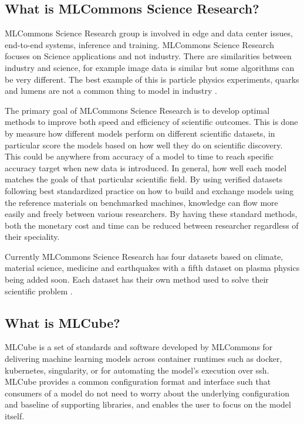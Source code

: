 \documentclass[sigplan,screen]{acmart}
\providecommand{\mlcube}{MLCube}
\begin{document}
\subsection{What is MLCommons Science Research?}

MLCommons Science Research group is involved in edge and data center
issues, end-to-end systems, inference and training. MLCommons Science
Research focuses on Science applications and not industry. There are
similarities between industry and science, for example image data is
similar but some algorithms can be very different. The best example of
this is particle physics experiments, quarks and lumens are not a
common thing to model in industry \cite{www-mlcommons-science}.

The primary goal of MLCommons Science Research is to develop optimal
methods to improve both speed and efficiency of scientific
outcomes. This is done by measure how different models perform on
different scientific datasets, in particular score the models based on
how well they do on scientific discovery. This could be anywhere from
accuracy of a model to time to reach specific accuracy target when new
data is introduced. In general, how well each model matches the goals
of that particular scientific field. By using verified datasets
following best standardized practice on how to build and exchange
models using the reference materials on benchmarked machines,
knowledge can flow more easily and freely between various
researchers. By having these standard methods, both the monetary cost
and time can be reduced between researcher regardless of their
speciality.

Currently MLCommons Science Research has four datasets based on
climate, material science, medicine and earthquakes with a fifth
dataset on plasma physics being added soon. Each dataset has their own
method used to solve their scientific problem
\cite{www-mlcommons-science}.

\subsection{What is \mlcube{}?}

\mlcube{} is a set of standards and software developed by MLCommons
for delivering machine learning models across container runtimes such
as docker, kubernetes, singularity, or for automating the model's
execution over ssh.  \mlcube{} provides a common configuration format
and interface such that consumers of a model do not need to worry
about the underlying configuration and baseline of supporting
libraries, and enables the user to focus on the model
itself\cite{www-mlcube}.
\end{document}
